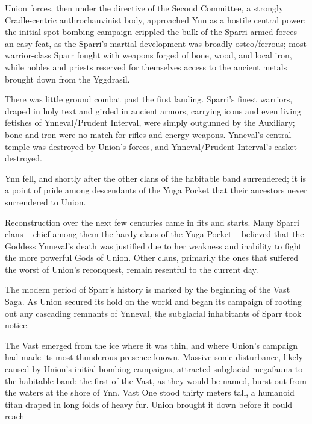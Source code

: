 Union forces, then under the directive of the Second Committee, a strongly Cradle-centric  
anthrochauvinist body, approached Ynn as a hostile central power: the initial spot-bombing  
campaign crippled the bulk of the Sparri armed forces -- an easy feat, as the Sparri’s martial  
development was broadly osteo/ferrous; most warrior-class Sparr fought with weapons forged of  
bone, wood, and local iron, while nobles and priests reserved for themselves access to the  
ancient metals brought down from the Yggdrasil.  

There was little ground combat past the first landing. Sparri’s finest warriors, draped in holy text  
and girded in ancient armors, carrying icons and even living fetishes of Ynneval/Prudent Interval,  
were simply outgunned by the Auxiliary; bone and iron were no match for rifles and energy  
weapons. Ynneval’s central temple was destroyed by Union’s forces, and Ynneval/Prudent  
Interval’s casket destroyed.    

Ynn fell, and shortly after the other clans of the habitable band surrendered; it is a point of pride  
among descendants of the Yuga Pocket that their ancestors never surrendered to Union.   

Reconstruction over the next few centuries came in fits and starts. Many Sparri clans -- chief  
among them the hardy clans of the Yuga Pocket -- believed that the Goddess Ynneval’s death  
was justified due to her weakness and inability to fight the more powerful Gods of Union. Other  
clans, primarily the ones that suffered the worst of Union’s reconquest, remain resentful to the  
current day.   

The modern period of Sparr’s history is marked by the beginning of the Vast Saga. As Union  
secured its hold on the world and began its campaign of rooting out any cascading remnants of  
Ynneval, the subglacial inhabitants of Sparr took notice.   

The Vast emerged from the ice where it was thin, and where Union’s campaign had made its most  
thunderous presence known. Massive sonic disturbance, likely caused by Union’s initial bombing  
campaigns, attracted subglacial megafauna to the habitable band: the first of the Vast, as they  
would be named, burst out from the waters at the shore of Ynn. Vast One stood thirty meters tall,  
a humanoid titan draped in long folds of heavy fur. Union brought it down before it could reach  

                                                                                                          


